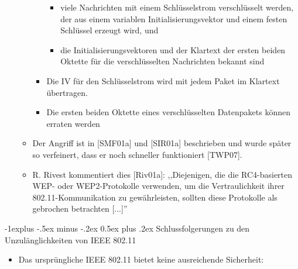 \documentclass[a4paper]{article}
\makeatletter
\renewcommand{\subsection}{\@startsection{subsection}{2}{0mm}%
 {-1explus -.5ex minus -.2ex}%
 {0.5ex plus .2ex}%
 {\normalfont\normalsize\bfseries}}
\makeatother
\begin{document}
\begin{multicols}{3}
\begin{itemize}
\begin{itemize}
\begin{itemize}
                                  \begin{itemize}
                                      \item
                                            viele Nachrichten mit einem Schlüsselstrom verschlüsselt werden,
                                            der aus einem variablen Initialisierungsvektor und einem festen
                                            Schlüssel erzeugt wird, und
                                      \item
                                            die Initialisierungsvektoren und der Klartext der ersten beiden
                                            Oktette für die verschlüsselten Nachrichten bekannt sind
                                  \end{itemize}
                            \item
                                  Die IV für den Schlüsselstrom wird mit jedem Paket im Klartext
                                  übertragen.
                            \item
                                  Die ersten beiden Oktette eines verschlüsselten Datenpakets können
                                  erraten werden
                        \end{itemize}
                  \item
                        Der Angriff ist in {[}SMF01a{]} und {[}SIR01a{]} beschrieben und
                        wurde später so verfeinert, dass er noch schneller funktioniert
                        {[}TWP07{]}.
                  \item
                        R. Rivest kommentiert dies {[}Riv01a{]}: ,,Diejenigen, die die
                        RC4-basierten WEP- oder WEP2-Protokolle verwenden, um die
                        Vertraulichkeit ihrer 802.11-Kommunikation zu gewährleisten, sollten
                        diese Protokolle als gebrochen betrachten {[}...{]}''
              \end{itemize}
    \end{itemize}


    \subsection{Schlussfolgerungen zu den Unzulänglichkeiten von IEEE
        802.11}

    \begin{itemize}
        \item
              Das ursprüngliche IEEE 802.11 bietet keine ausreichende Sicherheit:


\end{itemize}
\end{multicols}
\end{document}
